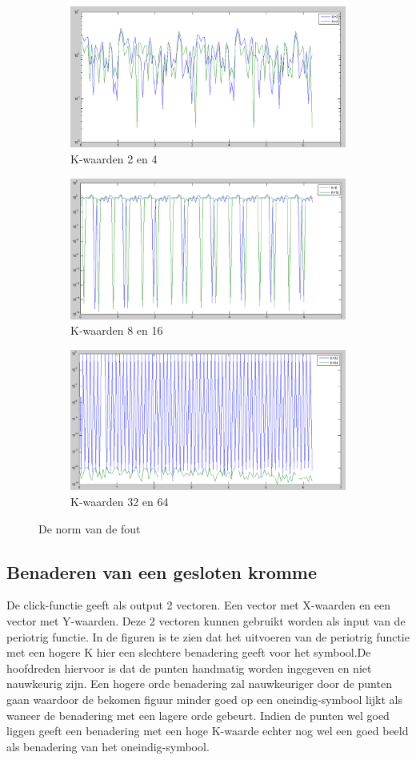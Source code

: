 \documentclass[a4paper, 12pt, titlepage]{report}
\begin{document}
\begin{figure}
\centering
\begin{subfigure}{.5\textwidth}
  \centering
  \includegraphics[width=.4\linewidth]{errorK2K4.png}
  \caption{K-waarden 2 en 4}
  \label{fig:sub1}
\end{subfigure}%
\begin{subfigure}{.5\textwidth}
  \centering
  \includegraphics[width=.4\linewidth]{errorK8K16.png}
  \caption{K-waarden 8 en 16}
  \label{fig:sub2}
\end{subfigure}
\begin{subfigure}{.5\textwidth}
  \centering
  \includegraphics[width=.4\linewidth]{errorK32K64.png}
  \caption{K-waarden 32 en 64}
  \label{fig:sub2}
\end{subfigure}
\caption{De norm van de fout}
\label{fig:test}
\end{figure}

\subsection{Benaderen van een gesloten kromme}
De click-functie geeft als output 2 vectoren. Een vector met X-waarden en een vector met Y-waarden. Deze 2 vectoren kunnen gebruikt worden als input van de periotrig functie. In de figuren is te zien dat het uitvoeren van de periotrig functie met een hogere K hier een slechtere benadering geeft voor het symbool.De hoofdreden hiervoor is dat de punten handmatig worden ingegeven en niet nauwkeurig zijn. Een hogere orde benadering zal nauwkeuriger door de punten gaan waardoor de bekomen figuur minder goed op een oneindig-symbool lijkt als waneer de benadering met een lagere orde gebeurt. Indien de punten wel goed liggen geeft een benadering met een hoge K-waarde echter nog wel een goed beeld als benadering van het oneindig-symbool.
\end{document}
